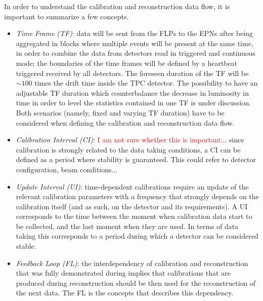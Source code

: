 In order to understand the calibration and reconstruction data flow, it is important to summarize a few concepts.
\begin{itemize}
	\item \textit{Time Frame (TF)}: data will be sent from the FLPs to the EPNs after being aggregated in blocks where multiple
	events will be present at the same time, in order to combine the data from detectors read in triggered and 
	continuous mode; the boundaries of the time frames will be defined by a heartbeat triggered received by all detectors. The
	foreseen duration of the TF will be $\sim 100$ times the drift time inside the TPC detector. The possibility to 
	have an adjustable TF duration which counterbalance the decrease in luminosity in time in order to level the 
	statistics contained in one TF is under discussion. Both scenarios (namely, fixed and varying TF duration) have to 
	be considered when defining the calibration and reconstruction data flow.
	\item \textit{Calibration Interval (CI)}: \textcolor{red}{I am not sure whether this is important...} since calibration is strongly
	related to the data taking conditions, a CI can be defined as a period where stability is guaranteed. This could refer 
	to detector configuration, beam conditions... 
	\item \textit{Update Interval (UI)}: time-dependent calibrations require an update of the relevant calibration parameters
	with a frequency that strongly depends on the calibration itself (and as such, on the detector and its requirements). A UI 
	corresponds to the time between the moment when calibration data start to be collected, and the last moment when they
	are used. In terms of data taking this corresponds to a period during which a detector can be considered stable. 
	\item \textit{Feedback Loop (FL)}: the interdependency of calibration and reconstruction that was fully demonstrated during 
	 implies that calibrations that are produced during reconstruction should be then used for the reconstruction 
	of the next data. The FL is the concepts that describes this dependency.
\end{itemize} 

